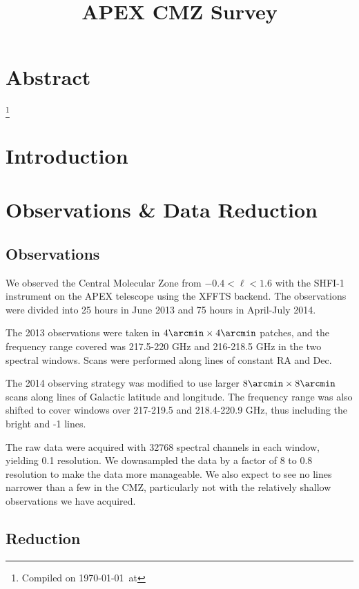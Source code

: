 

\title{APEX CMZ Survey}


\section{Abstract}

\footnote{Compiled on \today\ at \currenttime}


\section{Introduction}






\section{Observations \& Data Reduction}

\subsection{Observations}
We observed the Central Molecular Zone from $-0.4 < \ell < 1.6$ with the SHFI-1
instrument \citep{Vassilev2008a} on the APEX telescope using the XFFTS backend.
The observations were divided into 25 hours in June 2013 and 75 hours in
April-July 2014.  

The 2013 observations were taken in $4\arcmin \times 4\arcmin$ patches, and the
frequency range covered was 217.5-220 GHz and 216-218.5 GHz in the two spectral
windows.  Scans were performed along lines of constant RA and Dec.

The 2014 observing strategy was modified to use larger $8\arcmin \times
8\arcmin$ scans along lines of Galactic latitude and longitude.  The frequency
range was also shifted to cover windows over 217-219.5 and 218.4-220.9 GHz, thus
including the bright \thirteenco and -1 lines.

The raw data were acquired with 32768 spectral channels in each window, yielding
0.1 \kms resolution.  We downsampled the data by a factor of 8 to 0.8 \kms
resolution to make the data more manageable.  We also expect to see no lines
narrower than a few \kms in the CMZ, particularly not with the relatively
shallow observations we have acquired.

\subsection{Reduction}
